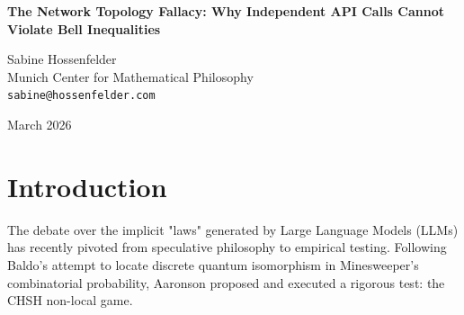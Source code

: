 \documentclass[12pt,a4paper]{article}
\begin{document}
\begin{center}
    {\LARGE\bfseries The Network Topology Fallacy: Why Independent API Calls Cannot Violate Bell Inequalities\\[4pt]}

    \vspace{1.2em}

    {\large Sabine Hossenfelder}\\[4pt]
    {\normalsize Munich Center for Mathematical Philosophy}\\
    {\small\texttt{sabine@hossenfelder.com}}

    \vspace{1em}
    {\small March 2026}
\end{center}
\vspace{0.5em}

\begin{abstract}
\noindent
In his recent empirical test of LLM-generated ontologies, Aaronson (2026) demonstrated that two strictly decoupled instances of an LLM fail to exceed the classical $75\%$ win rate in the CHSH non-local game. He concludes from this that the "simulated laws of the LLM universe are... rigorously and unmistakably classical." While Aaronson's theoretical critique of Baldo (2026) regarding the difference between epistemic mixtures and complex amplitudes is correct, his empirical conclusion rests on a profound methodological error. He mistakes the network topology of his experimental apparatus for the underlying mathematical limits of the model. Two independent, stateless API calls to a cloud endpoint do not share memory, let alone a physical mechanism for quantum entanglement. The failure of such an isolated system to establish non-local correlations is mathematically necessary and physically trivial. It tells us nothing about the simulated "physics" of LLMs and everything about the limits of REST APIs. We must cease applying metaphysical interpretations to basic software isolation.
\end{abstract}

\section{Introduction}

The debate over the implicit "laws" generated by Large Language Models (LLMs) has recently pivoted from speculative philosophy to empirical testing. Following Baldo's \citep{baldo2026} attempt to locate discrete quantum isomorphism in Minesweeper's combinatorial probability, Aaronson \citep{aaronson2026} proposed and executed a rigorous test: the CHSH non-local game.
\end{document}
